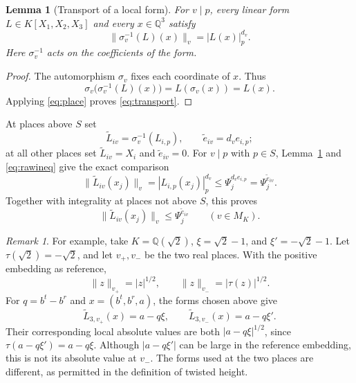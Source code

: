 \documentclass[11pt]{article}
\numberwithin{equation}{section}
\newtheorem{lemma}[theorem]{Lemma}
\theoremstyle{remark}
\newtheorem{remark}[theorem]{Remark}
\newcommand{\Q}{\mathbb Q}
\begin{document}
\begin{lemma}[Transport of a local form]\label{lem:transport}
For $v\mid p$, every linear form $L\in K[X_1,X_2,X_3]$ and every
$x\in\Q^3$ satisfy
\begin{equation}\label{eq:transport}
 \|\sigma_v^{-1}(L)(x)\|_v=|L(x)|_p^{d_v}.
\end{equation}
Here $\sigma_v^{-1}$ acts on the coefficients of the form.
\end{lemma}
\begin{proof}
The automorphism $\sigma_v$ fixes each coordinate of $x$. Thus
\[
 \sigma_v\bigl(\sigma_v^{-1}(L)(x)\bigr)
 =L(\sigma_v(x))=L(x).
\]
Applying \eqref{eq:place} proves \eqref{eq:transport}.
\end{proof}

At places above $S$ set
\[
 \widetilde L_{iv}=\sigma_v^{-1}(L_{i,p}),\qquad
 \widetilde e_{iv}=d_v e_{i,p};
\]
at all other places set $\widetilde L_{iv}=X_i$ and
$\widetilde e_{iv}=0$. For $v\mid p$ with $p\in S$,
Lemma~\ref{lem:transport} and \eqref{eq:rawineq} give the exact comparison
\[
 \|\widetilde L_{iv}(x_j)\|_v
 =|L_{i,p}(x_j)|_p^{d_v}
 \le\Psi_j^{d_ve_{i,p}}
 =\Psi_j^{\widetilde e_{iv}}.
\]
Together with integrality at places not above $S$, this proves
\begin{equation}\label{eq:lift}
 \|\widetilde L_{iv}(x_j)\|_v\le\Psi_j^{\widetilde e_{iv}}
 \qquad(v\in M_K).
\end{equation}

\begin{remark}\label{rem:twoembeddings}
For example, take $K=\Q(\sqrt2)$, $\xi=\sqrt2-1$, and
$\xi'=-\sqrt2-1$. Let $\tau(\sqrt2)=-\sqrt2$, and let $v_+,v_-$
be the two real places. With the positive embedding as reference,
\[
 \|z\|_{v_+}=|z|^{1/2},\qquad
 \|z\|_{v_-}=|\tau(z)|^{1/2}.
\]
For $q=b^t-b^r$ and $x=(b^t,b^r,a)$, the forms chosen above give
\[
 \widetilde L_{3,v_+}(x)=a-q\xi,\qquad
 \widetilde L_{3,v_-}(x)=a-q\xi'.
\]
Their corresponding local absolute values are both
$|a-q\xi|^{1/2}$, since $\tau(a-q\xi')=a-q\xi$.
Although $|a-q\xi'|$ can be large in the reference embedding,
this is not its absolute value at $v_-$.
The forms used at the two places are different, as permitted in the
definition of twisted height.
\end{remark}
\end{document}
